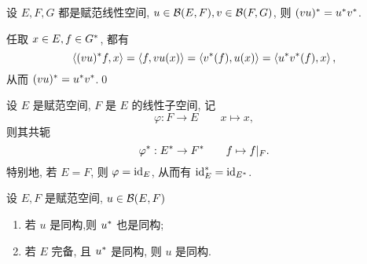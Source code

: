     \begin{Proposition}
        设 $ E, F, G $ 都是赋范线性空间, $ u\in\mathcal{B}(E, F), v\in\mathcal{B}(F, G) $, 则 $ (vu)^{*}=u^{*}v^{*} $.
    \end{Proposition}
    \begin{Proof}
        任取 $ x\in E, f\in G^{*} $, 都有
        \[
            \left\langle (vu)^{*}f, x \right\rangle=\left\langle f, vu(x) \right\rangle=\left\langle v^{*}(f), u(x) \right\rangle=\left\langle u^{*}v^{*}(f), x \right\rangle,
        \]
        从而 $ (vu)^{*}=u^{*}v^{*} $.\qed
    \end{Proof}

    \begin{Example}
        设 $ E $ 是赋范空间, $ F $ 是 $ E $ 的线性子空间, 记
        \[
            \varphi: F\to E\qquad x\mapsto x,
        \]
        则其共轭
        \[
            \varphi^{*}: E^{*}\to F^{*}\qquad f\mapsto f|_{F}.
        \]
        特别地, 若 $ E=F $, 则 $ \varphi=\mathrm{id}_{E} $, 从而有 $ \mathrm{id}_{E}^{*}=\mathrm{id}_{E^{*}} $.
    \end{Example}    
    \begin{Theorem}
        设 $ E, F $ 是赋范空间, $ u\in\mathcal{B}(E, F) $
        \begin{enumerate}[(1)]
            \item 若 $ u $ 是同构,则 $ u^{*} $ 也是同构;
            \item 若 $ E $ 完备, 且 $ u^{*} $ 是同构, 则 $ u $ 是同构.
        \end{enumerate}
    \end{Theorem}
